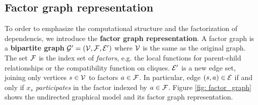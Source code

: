 \documentclass[11pt]{article}
\begin{document}
\subsection{Factor graph representation} 
To order to emphasize the computational structure and the factorization of dependencis, we introduce the \textbf{factor graph representation}. A factor graph is a \textbf{bipartite graph} ${\mathcal G}' = ({\mathcal V}, {\mathcal F}, {\mathcal E}')$ where ${\mathcal V}$ is the same as the original graph. The set ${\mathcal F}$ is the index set of \emph{factors}, e.g. the local functions for parent-child relationships or the compatibility function on cliques. ${\mathcal E}'$ is a new edge set, joining only vertices $s \in  {\mathcal V}$ to factors $a \in {\mathcal F}$. In particular,
edge $(s,a) \in {\mathcal E}$ if and only if $x_s$ \emph{participates} in the factor indexed by $a \in {\mathcal F}$. Figure \ref{fig: factor_graph} shows the undirected graphical model and its factor graph representation.
\end{document}
